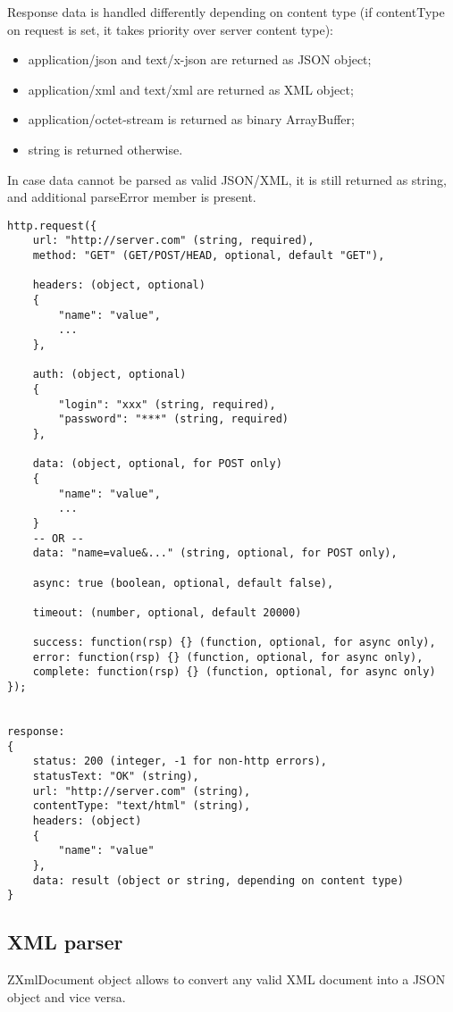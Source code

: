 Response data is handled differently depending on content type (if contentType on request 
is set, it takes priority over server content type):

\begin{itemize}
\item application/json and text/x-json are returned as JSON object;
\item application/xml and text/xml are returned as XML object;
\item application/octet-stream is returned as binary ArrayBuffer;
\item string is returned otherwise.
\end{itemize}
In case data cannot be parsed as valid JSON/XML, it is still returned as string, and 
additional parseError member is present.


\begin{lstlisting}[basicstyle=\small,columns=fullflexible]
http.request({
	url: "http://server.com" (string, required),
	method: "GET" (GET/POST/HEAD, optional, default "GET"),
	
	headers: (object, optional)
	{
		"name": "value",
		...
	},
	
	auth: (object, optional)
	{
		"login": "xxx" (string, required),
		"password": "***" (string, required)
	},
	
	data: (object, optional, for POST only)
	{
		"name": "value",
		...
	}
	-- OR --
	data: "name=value&..." (string, optional, for POST only),

	async: true (boolean, optional, default false),

	timeout: (number, optional, default 20000)
	
	success: function(rsp) {} (function, optional, for async only),
	error: function(rsp) {} (function, optional, for async only),
	complete: function(rsp) {} (function, optional, for async only)
});


response:
{
	status: 200 (integer, -1 for non-http errors),
	statusText: "OK" (string),
	url: "http://server.com" (string),
	contentType: "text/html" (string),
	headers: (object)
	{
		"name": "value"
	},
	data: result (object or string, depending on content type)
}
\end{lstlisting}

\subsection{XML parser}

ZXmlDocument object allows to convert any valid XML document into a JSON object and vice versa.

